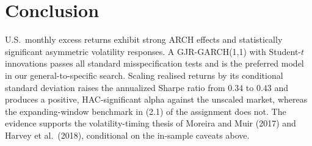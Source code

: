 \documentclass[12pt]{article}
\begin{document}
\section{Conclusion}

U.S.\ monthly excess returns exhibit strong ARCH effects and statistically significant asymmetric volatility responses. A GJR-GARCH(1,1) with Student-$t$ innovations passes all standard misspecification tests and is the preferred model in our general-to-specific search. Scaling realised returns by its conditional standard deviation raises the annualized Sharpe ratio from $0.34$ to $0.43$ and produces a positive, HAC-significant alpha against the unscaled market, whereas the expanding-window benchmark in (2.1) of the assignment does not. The evidence supports the volatility-timing thesis of Moreira and Muir (2017) and Harvey et al.\ (2018), conditional on the in-sample caveats above.
\end{document}
